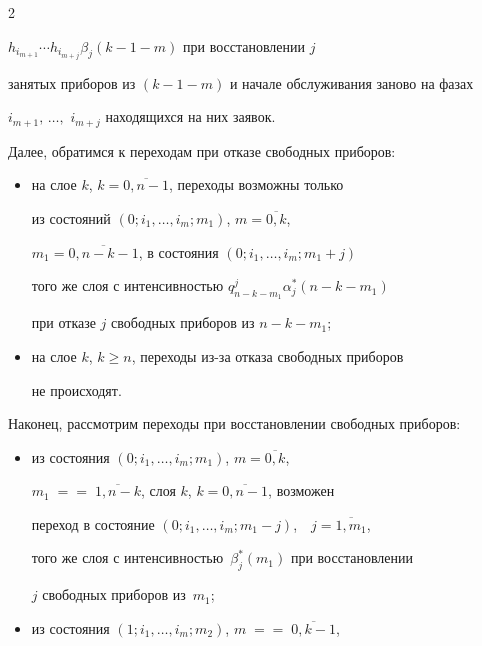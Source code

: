 \begin{multicols}{2}
\begin{itemize}
$h_{i_{m+1}}\cdots h_{i_{m+j}}\beta_j(k-1-m)$ при восстановлении $j$


занятых приборов из $(k-1-m)$ и начале обслуживания заново на фазах


$i_{m+1},\,\ldots,$ $i_{m+j}$ находящихся на них заявок.


\end{itemize}





Далее, обратимся к переходам при отказе свободных приборов:


\begin{itemize}


\item на слое $k$, $k=\overline{0,n-1}$, переходы возможны только


из состояний $(0;i_1,\ldots,i_m;m_1)$, $m=\overline{0,k}$,


$m_1=\overline{0,n-k-1}$, в состояния $(0;i_1,\ldots,i_m;m_1+j)$


того же слоя с интенсивностью $q^j_{n-k-m_1}\alpha^*_j(n-k-m_1)$


при отказе $j$ свободных приборов из $n-k-m_1$;


\item


на слое $k$, $k\ge n$, переходы из-за отказа свободных приборов


не происходят.


\end{itemize}





Наконец, рассмотрим переходы при вос\-ста\-нов\-ле\-нии свободных приборов:


\begin{itemize}


\item из состояния $(0;i_1,\ldots,i_m;m_1)$, $m=\overline{0,k}$,


$m_1\;=$\linebreak $=\;\overline{1,n-k}$, слоя $k$, $k=\overline{0,n-1}$, возможен


переход в состояние $(0;i_1,\ldots,i_{m};m_1-j)$,\ \ $j=\overline{1,m_1}$,


того же слоя с интенсивностью~$\beta^*_j(m_1)$ при восстановлении


$j$ свободных приборов из~$m_1$;


\item


из состояния $(1;i_1,\ldots,i_m;m_2)$, $m\;=$\linebreak $=\;\overline{0,k-1}$,



\end{itemize}
\end{multicols}
